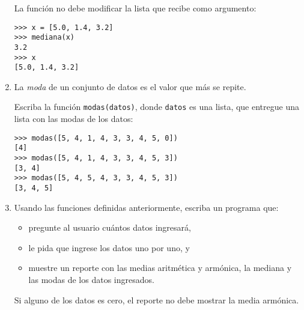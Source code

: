 \begin{enumerate}
    La función no debe modificar la lista que recibe como argumento:
\begin{lstlisting}
>>> x = [5.0, 1.4, 3.2]
>>> mediana(x)
3.2
>>> x
[5.0, 1.4, 3.2]
\end{lstlisting}

  \item
    La \emph{moda} de un conjunto de datos es el valor que más se repite.

    Escriba la función \lstinline!modas(datos)!, donde \lstinline!datos! es
    una lista, que entregue una lista con las modas de los datos:
\begin{lstlisting}
>>> modas([5, 4, 1, 4, 3, 3, 4, 5, 0])
[4]
>>> modas([5, 4, 1, 4, 3, 3, 4, 5, 3])
[3, 4]
>>> modas([5, 4, 5, 4, 3, 3, 4, 5, 3])
[3, 4, 5]
\end{lstlisting}

  \item
    Usando las funciones definidas anteriormente, escriba un programa que:
    \begin{itemize}
    \item
      pregunte al usuario cuántos datos ingresará,
    \item
      le pida que ingrese los datos uno por uno, y
    \item
      muestre un reporte con las medias aritmética y armónica, la mediana y
      las modas de los datos ingresados.
    \end{itemize}

    Si alguno de los datos es cero, el reporte no debe mostrar la media
    armónica.

\end{enumerate}
